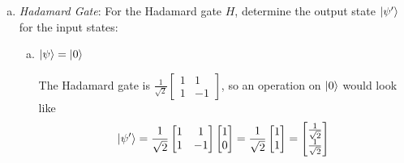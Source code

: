 \documentclass[10pt,letterpaper]{article}
\begin{document}
\begin{enumerate}
\begin{enumerate}[a)]
\begin{enumerate}[i.]
\begin{itemize}
\item Show that the Pauli-Z gate rotates the initial state by $\pi$ radians around the z-axis. 

\color{violet}
The Pauli-Z gate is $\begin{bmatrix}
1 & 0 \\
0 & -1 
\end{bmatrix}$, so an operation would be
\begin{gather*}
\ket{\psi'} = \begin{bmatrix}
1 & 0 \\
0 & -1 
\end{bmatrix}\begin{bmatrix}
\alpha \\
\beta 
\end{bmatrix} = \begin{bmatrix}
\alpha \\
-\beta
\end{bmatrix} \rightarrow \alpha\ket{0} - \beta\ket{1}
\end{gather*}
Given an initial state $\ket{+}$, the new state would be $\frac{1}{\sqrt{2}}\ket{0} - \frac{1}{\sqrt{2}}\ket{1}$, which is $\ket{-}$. 
\color{black}

\end{itemize}

\end{enumerate}

\item \textit{Hadamard Gate}: For the Hadamard gate $H$, determine the output state $\ket{\psi'}$ for the input states:

\begin{enumerate}[a.]

\item $\ket{\psi} = \ket{0}$

\color{violet}
The Hadamard gate is $\frac{1}{\sqrt{2}}\begin{bmatrix}
1 & 1 \\
1 & -1 
\end{bmatrix}$, so an operation on $\ket{0}$ would look like
\begin{gather*}
\ket{\psi'} = \frac{1}{\sqrt{2}}\begin{bmatrix}
1 & 1 \\
1 & -1
\end{bmatrix}\begin{bmatrix}
1 \\
0 
\end{bmatrix} = \frac{1}{\sqrt{2}}\begin{bmatrix}
1 \\
1 
\end{bmatrix} = \begin{bmatrix}
\frac{1}{\sqrt{2}} \\
\frac{1}{\sqrt{2}}
\end{bmatrix}
\end{gather*}
\color{black}


\end{enumerate}
\end{enumerate}
\end{enumerate}
\end{document}
